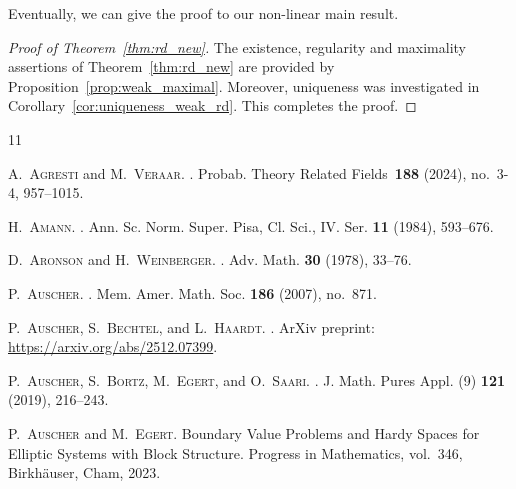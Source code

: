 \documentclass[11pt, leqno]{amsart}
\theoremstyle{definition}
\begin{document}
	Eventually, we can give the proof to our non-linear main result.

	\begin{proof}[Proof of Theorem~\ref{thm:rd_new}]
		The existence, regularity and maximality assertions of Theorem~\ref{thm:rd_new} are provided by Proposition~\ref{prop:weak_maximal}.
		Moreover, uniqueness was investigated in Corollary~\ref{cor:uniqueness_weak_rd}. This completes the proof.
	\end{proof}


	\begin{thebibliography}{11}

		\textsc{A.~Agresti} and \textsc{M.~Veraar}.
		.
		\newblock Probab. Theory Related Fields~\textbf{188} (2024), no.~3-4, 957--1015.

		\textsc{H.~Amann}.
		.
		\newblock Ann. Sc. Norm. Super. Pisa, Cl. Sci., IV. Ser. \textbf{11} (1984), 593--676.


		\textsc{D.~Aronson} and \textsc{H.~Weinberger}.
		.
		\newblock Adv. Math. \textbf{30} (1978), 33--76.

		\textsc{P.~Auscher}.
		.
		\newblock Mem. Amer. Math. Soc. \textbf{186} (2007), no.~871.

		\textsc{P.~Auscher}, \textsc{S.~Bechtel}, and \textsc{L.~Haardt}.
		.
		\newblock ArXiv preprint: \url{https://arxiv.org/abs/2512.07399}.

		\textsc{P.~Auscher}, \textsc{S.~Bortz}, \textsc{M.~Egert}, and \textsc{O.~Saari}.
		.
		\newblock J. Math. Pures Appl. (9) \textbf{121} (2019), 216--243.

		\textsc{P.~Auscher} and \textsc{M.~Egert}.
		\newblock Boundary Value Problems and Hardy Spaces for Elliptic Systems with Block Structure. Progress in Mathematics, vol.~346,
		\newblock Birkhäuser, Cham, 2023.



\end{thebibliography}
\end{document}

